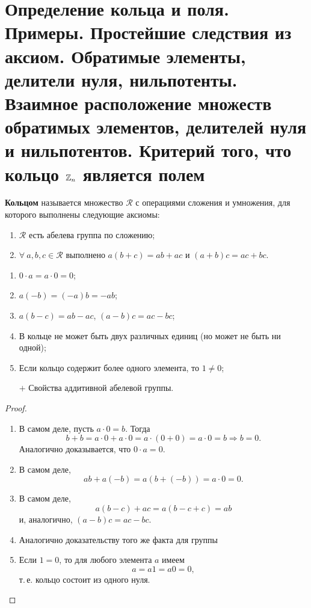 \section{Определение кольца и поля. Примеры. Простейшие следствия из аксиом. Обратимые элементы, делители нуля, нильпотенты. Взаимное расположение множеств обратимых элементов, делителей нуля и нильпотентов. Критерий того, что кольцо $\mathbb{Z}_n$ является полем}

\begin{definition}
    \textbf{Кольцом} называется множество $\mathcal{R}$ с операциями сложения и умножения, для которого выполнены следующие аксиомы:
    \begin{enumerate}[nolistsep]
        \item $\mathcal{R}$ есть абелева группа по сложению;
        \item $\forall\!\:a, b, c \in \mathcal{R}$ выполнено $a(b + c) = ab + ac$ и $(a + b)c = ac + bc$.
    \end{enumerate}
\end{definition}

\begin{theorem}
    \begin{enumerate}[nolistsep]
        \item $0 \cdot a = a \cdot 0 = 0$;
        \item $a(-b) = (-a)b = -ab$;
        \item $a(b - c) = ab - ac$, $(a - b)c = ac - bc$;
        \item В кольце не может быть двух различных единиц (но может не быть ни одной);
        \item Если кольцо содержит более одного элемента, то $1 \ne 0$;
        \item[$+$] Свойства аддитивной абелевой группы.
    \end{enumerate}
\end{theorem}

\begin{proof}
    \begin{enumerate}[nolistsep]
        \item В самом деле, пусть $a \cdot 0 = b$. Тогда
            $$
            b + b = a \cdot 0 + a \cdot 0 = a \cdot (0 + 0) = a \cdot 0 = b \Rightarrow b = 0.
            $$
            Аналогично доказывается, что $0\cdot a = 0$.
        \item В самом деле, 
            $$
            ab + a(-b) = a(b + (-b)) = a \cdot 0 = 0.
            $$
        \item В самом деле,
            $$
            a(b - c) + ac = a(b - c + c) = ab
            $$
            и, аналогично, $(a - b)c = ac - bc$.
        \item Аналогично доказательству того же факта для группы
        \item Если $1 = 0$, то для любого элемента $a$ имеем
            $$
            a = a 1 = a 0 = 0,
            $$
            т.\,е. кольцо состоит из одного нуля.
    \end{enumerate}
\end{proof}

